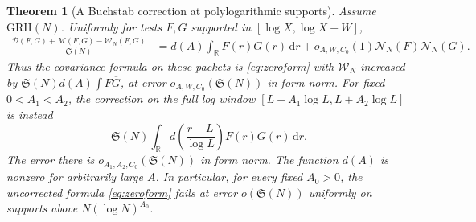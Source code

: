\documentclass[11pt,a4paper]{article}
\numberwithin{equation}{section}
\newtheorem{theorem}{Theorem}[section]
\newcommand{\SSS}{\mathfrak S}
\newcommand{\grh}{\mathrm{GRH}}
\newcommand{\ud}{\mathrm d}
\newcommand{\NN}{\mathcal N_N}
\begin{document}
\begin{theorem}[A Buchstab correction at polylogarithmic supports]
\label{thm:primorialmodel}
Assume $\grh(N)$. Uniformly for tests $F,G$ supported in
$[\log X,\log X+W]$,
\begin{align}
 \frac{\mathcal D(F,G)+\mathcal M(F,G)-\mathcal W_N(F,G)}
                 {\SSS(N)}
    &=d(A)\int_{\mathbb R}F(r)\overline{G(r)}\,\ud r
                   +o_{A,W,C_0}(1)\NN(F)\NN(G).
 \label{eq:primorialdefect}
\end{align}
Thus the covariance formula on these packets is
\cref{eq:zeroform} with $\mathcal W_N$ increased by
$\SSS(N)d(A)\int F\overline G$, at error
$o_{A,W,C_0}(\SSS(N))$ in form norm.
For fixed $0<A_1<A_2$, the correction on the full log
window $[L+A_1\log L,L+A_2\log L]$ is instead
\begin{equation}
 \SSS(N)\int_{\mathbb R}
       d\!\left(\frac{r-L}{\log L}\right)
                         F(r)\overline{G(r)}\,\ud r.
 \label{eq:primorialfullwindow}
\end{equation}
The error there is $o_{A_1,A_2,C_0}(\SSS(N))$ in form norm.
The function $d(A)$ is nonzero for arbitrarily large $A$.
In particular, for every fixed $A_0>0$, the uncorrected
formula \eqref{eq:zeroform} fails at error $o(\SSS(N))$
uniformly on supports above $N(\log N)^{A_0}$.
\end{theorem}
\end{document}
